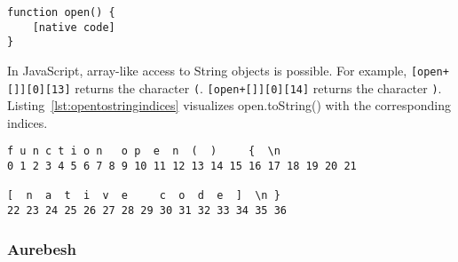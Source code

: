 \begin{lstlisting}[style=basicStyle, caption=open.toString() in JavaScript, label={lst:opentostring}]
function open() {
    [native code]
}
\end{lstlisting}

In JavaScript, array-like access to String objects is possible. \cite{js/stringbrackets} For example, \verb|[open+[]][0][13]| returns the character \verb|(|. \verb|[open+[]][0][14]| returns the character \verb|)|. Listing~\ref{lst:opentostringindices} visualizes open.toString() with the corresponding indices.

\begin{lstlisting}[style=basicStyle, caption=open.toString() with indices in JavaScript, label={lst:opentostringindices}]
f u n c t i o n   o p  e  n  (  )     {  \n
0 1 2 3 4 5 6 7 8 9 10 11 12 13 14 15 16 17 18 19 20 21

[  n  a  t  i  v  e     c  o  d  e  ]  \n }
22 23 24 25 26 27 28 29 30 31 32 33 34 35 36
\end{lstlisting}


\subsubsection{Aurebesh}



